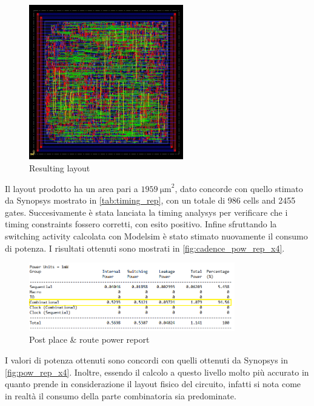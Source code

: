 \begin{figure}[h]
	\center
	\includegraphics[width=0.6\textwidth]{images/IIR_filter_period_min_x4_place.jpg}
	\caption{Resulting layout}
	\label{fig:layout}
\end{figure}

Il layout prodotto ha un area pari a $\SI{1959}{\micro\meter}^2$, dato concorde con quello stimato da Synopsys mostrato in \autoref{tab:timing_rep}, con un totale di 986 cells and 2455 gates. Succesivamente è stata lanciata la timing analysys per verificare che i timing constraints fossero corretti, con esito positivo. Infine sfruttando la switching activity calcolata con Modelsim è stato stimato nuovamente il consumo di potenza. I risultati ottenuti sono mostrati in \autoref{fig:cadence_pow_rep_x4}.

\begin{figure}[h]
	\center
	\includegraphics[width=0.8\textwidth]{images/rep_power_x4_cadence_mod.png}
	\caption{Post place \& route power report}
	\label{fig:cadence_pow_rep_x4}
\end{figure}

I valori di potenza ottenuti sono concordi con quelli ottenuti da Synopsys in \autoref{fig:pow_rep_x4}. Inoltre, essendo il calcolo a questo livello molto più accurato in quanto prende in considerazione il layout fisico del circuito, infatti si nota come in realtà il consumo della parte combinatoria sia predominate.
